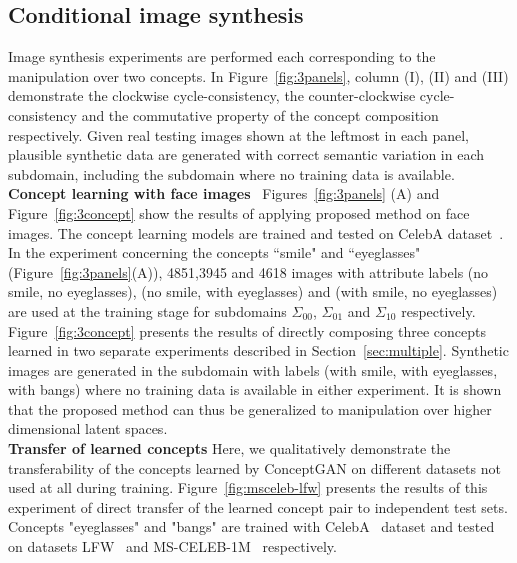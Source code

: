 \documentclass[10pt,twocolumn,letterpaper]{article}
\begin{document}
\subsection{Conditional image synthesis} \label{experiments}
Image synthesis experiments are performed each corresponding to the manipulation over two concepts. In Figure~\ref{fig:3panels}, column (I), (II) and (III) demonstrate the clockwise cycle-consistency, the counter-clockwise cycle-consistency and the commutative property of the concept composition respectively. Given real testing images shown at the leftmost in each panel, plausible synthetic data are generated with correct semantic variation in each subdomain, including the subdomain where no training data is available.
\\\textbf{Concept learning with face images}  ~Figures~\ref{fig:3panels} (A) and Figure~\ref{fig:3concept} show the results of applying proposed method on face images. The concept learning models are trained and tested on CelebA dataset~\cite{celebA}. In the experiment concerning the concepts ``smile" and ``eyeglasses" (Figure~\ref{fig:3panels}(A)), 4851,3945 and 4618 images with attribute labels (no smile, no eyeglasses), (no smile, with eyeglasses) and (with smile, no eyeglasses) are used at the training stage for subdomains $\Sigma_{00}$, $\Sigma_{01}$ and $\Sigma_{10}$ respectively. %
Figure~\ref{fig:3concept} presents the results of directly composing three concepts learned in two separate experiments described in Section~\ref{sec:multiple}. Synthetic images are generated in the subdomain with labels (with smile, with eyeglasses, with bangs) where no training data is available in either experiment. It is shown that the proposed method can thus be generalized to manipulation over higher dimensional latent spaces.
\\\textbf{Transfer of learned concepts} Here, we qualitatively demonstrate the transferability of the concepts learned by ConceptGAN on different datasets not used at all during training. Figure~\ref{fig:msceleb-lfw} presents the results of this experiment of direct transfer of the learned concept pair to independent test sets. Concepts "eyeglasses" and "bangs" are trained with CelebA~\cite{celebA} dataset and tested on datasets LFW~\cite{lfw} and MS-CELEB-1M~\cite{msceleb} respectively.
\end{document}

